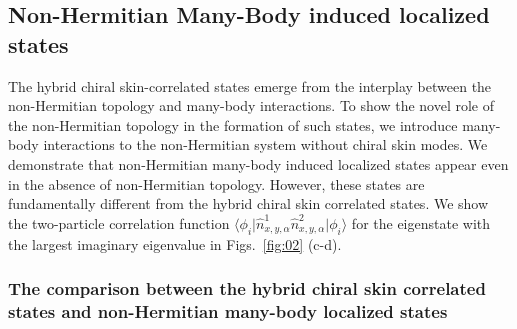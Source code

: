 \documentclass[longbibliography, aps, prx, amsmath, amssymb, amsfonts, twocolumn,superscriptaddress, footinbib]{revtex4-1}
\begin{document}
	\subsection{Non-Hermitian Many-Body induced localized states\label{sec:NHMBL}}

	The hybrid chiral skin-correlated states emerge from the interplay between the non-Hermitian topology and many-body interactions. To show the novel role of the non-Hermitian topology in the formation of such states, we introduce many-body interactions to the non-Hermitian system without chiral skin modes.
	We demonstrate that non-Hermitian many-body induced localized states appear even in the absence of non-Hermitian topology. However, these states are fundamentally different from the hybrid chiral skin correlated states.
    We show the two-particle correlation function $\langle \phi_i \vert \hat{n}^1_{x,y,\alpha} \hat{n}^2_{x,y,\alpha} \vert \phi_i \rangle$ for the eigenstate with the largest imaginary eigenvalue in Figs.~\ref{fig:02} (c-d).

	\subsubsection{The comparison between the hybrid chiral skin correlated states and non-Hermitian many-body localized states~\label{sec:appendixE_comp}}
    
\end{document}
